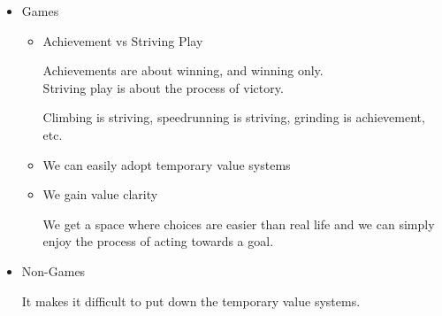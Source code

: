 \documentclass{report}
\begin{document}
\begin{description}
\begin{mdframed}
\begin{itemize}
\begin{mdframed}
                    \end{mdframed}
                \item Games
                    \begin{itemize}
                        \item Achievement vs Striving Play
                            \begin{mdframed}
                                Achievements are about winning,
                                and winning only.\\
                                Striving play is about the process
                                of victory.

                                \vspace{10pt}

                                Climbing is striving,
                                speedrunning is striving,
                                grinding is achievement,
                                etc.
                            \end{mdframed}
                        \item We can easily adopt temporary value
                            systems
                        \item We gain value clarity
                            \begin{mdframed}
                                We get a space where choices are
                                easier than real life and we can
                                simply enjoy the process of acting
                                towards a goal.
                            \end{mdframed}
                    \end{itemize}
                \item Non-Games
                    \begin{mdframed}
                        It makes it difficult to put down the
                        temporary value systems.
                    \end{mdframed}
            \end{itemize} 
        \end{mdframed}
\end{description}
\end{document}
